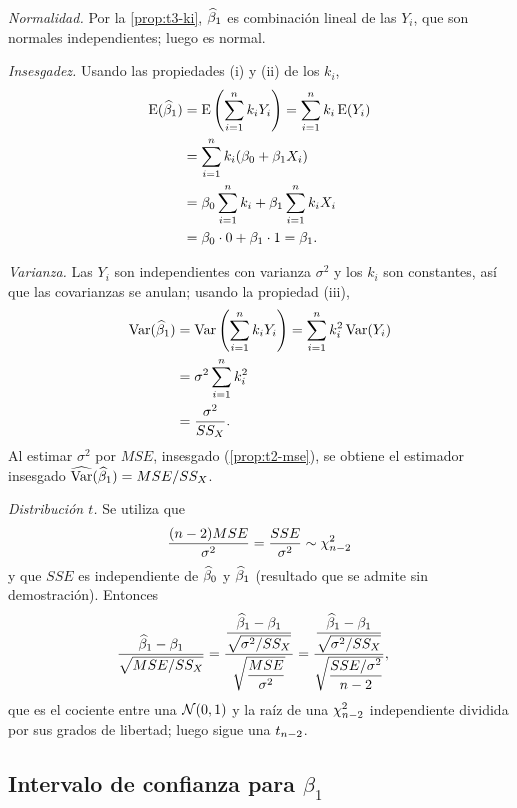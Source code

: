 \begin{demostracion}
  \emph{Normalidad.} Por la \cref{prop:t3-ki}, $\widehat{\beta}_1$ es combinación lineal de las
  $Y_i$, que son normales independientes; luego es normal.

  \emph{Insesgadez.} Usando las propiedades (i) y (ii) de los $k_i$,
  \begin{align*}
    \operatorname{E}(\widehat{\beta}_1) &= \operatorname{E}\left(\sum_{i=1}^{n} k_iY_i\right) = \sum_{i=1}^{n} k_i\operatorname{E}(Y_i) \\
    &= \sum_{i=1}^{n} k_i(\beta_0+\beta_1X_i) \\
    &= \beta_0\sum_{i=1}^{n} k_i + \beta_1\sum_{i=1}^{n} k_iX_i \\
    &= \beta_0\cdot0+\beta_1\cdot1 = \beta_1 .
  \end{align*}

  \emph{Varianza.} Las $Y_i$ son independientes con varianza $\sigma^2$ y los $k_i$ son
  constantes, así que las covarianzas se anulan; usando la propiedad (iii),
  \begin{align*}
    \operatorname{Var}(\widehat{\beta}_1) &= \operatorname{Var}\left(\sum_{i=1}^{n} k_iY_i\right) = \sum_{i=1}^{n} k_i^2\operatorname{Var}(Y_i) \\
    &= \sigma^2\sum_{i=1}^{n} k_i^2 \\
    &= \frac{\sigma^2}{SS_X} .
  \end{align*}
  Al estimar $\sigma^2$ por $MSE$, insesgado (\cref{prop:t2-mse}), se obtiene el estimador
  insesgado $\widehat{\operatorname{Var}}(\widehat{\beta}_1)=MSE/SS_X$.

  \emph{Distribución $t$.} Se utiliza que
  \[
    \frac{(n-2)MSE}{\sigma^2} = \frac{SSE}{\sigma^2} \sim \chi^2_{n-2}
  \]
  y que $SSE$ es independiente de $\widehat{\beta}_0$ y $\widehat{\beta}_1$ (resultado que se admite sin
  demostración). Entonces
  \begin{align*}
    \frac{\widehat{\beta}_1-\beta_1}{\sqrt{MSE/SS_X}}
    &= \frac{\dfrac{\widehat{\beta}_1-\beta_1}{\sqrt{\sigma^2/SS_X}}}
            {\sqrt{\dfrac{MSE}{\sigma^2}}}
     = \frac{\dfrac{\widehat{\beta}_1-\beta_1}{\sqrt{\sigma^2/SS_X}}}
            {\sqrt{\dfrac{SSE/\sigma^2}{n-2}}} ,
  \end{align*}
  que es el cociente entre una $\mathcal{N}(0,1)$ y la raíz de una $\chi^2_{n-2}$ independiente
  dividida por sus grados de libertad; luego sigue una $t_{n-2}$.
\end{demostracion}

\subsection{Intervalo de confianza para \texorpdfstring{$\beta_1$}{beta1}}

